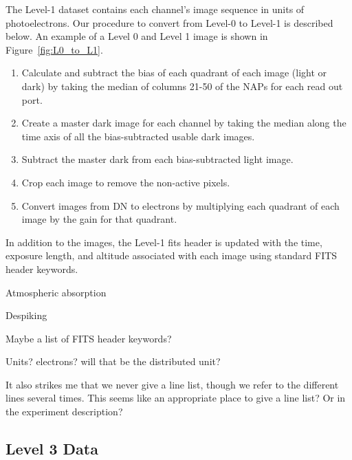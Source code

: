     	The Level-1 dataset contains each channel's image sequence in units of photoelectrons.
    	Our procedure to convert from Level-0 to Level-1 is described below. An example of a Level 0 and Level 1 image is shown in Figure~\ref{fig:L0_to_L1}.
    	
    	\begin{enumerate}
    	    \item Calculate and subtract the bias of each quadrant of each image (light or dark) by taking the median of columns 21-50 of the NAPs for each read out port.   
    	    \item Create a master dark image for each channel by taking the median along the time axis of all the bias-subtracted usable dark images.
    	    \item Subtract the master dark from each bias-subtracted light image.
    	    \item Crop each image to remove the non-active pixels.
    	    \item Convert images from DN to electrons by multiplying each quadrant of each image by the gain for that quadrant.
    	\end{enumerate}
    	
	In addition to the images, the Level-1 fits header is updated with the time, exposure length, and altitude associated with each image using standard FITS header keywords.   
	
	Atmospheric absorption
	
	Despiking
	
	Maybe a list of FITS header keywords?  
	
	Units?  electrons?  will that be the distributed unit?
	
	It also strikes me that we never give a line list, though we refer to the different lines several times.  This seems like an appropriate place to give a line list?  Or in the experiment description?

    \subsection{Level 3 Data}
 
    
    	\newcommand{\vigfit}{[0.44, 0.34, 0.38, 0.5]}
    	\newcommand{\levthreetime}{2019-09-30T18:08:51.644}
    	
